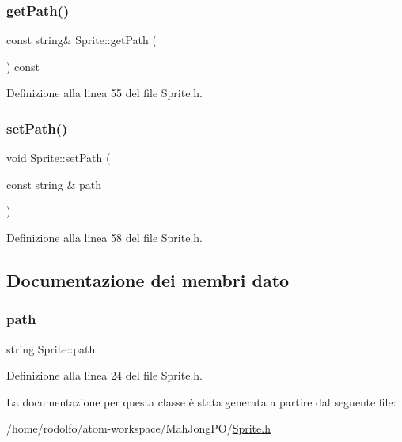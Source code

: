 \subsubsection{\texorpdfstring{get\+Path()}{getPath()}}
{\footnotesize\ttfamily const string\& Sprite\+::get\+Path (\begin{DoxyParamCaption}{ }\end{DoxyParamCaption}) const\hspace{0.3cm}{\ttfamily [inline]}}



Definizione alla linea 55 del file Sprite.\+h.

\mbox{\label{class_sprite_ac688bf8902344f265714447e6aa3a391}} 
\subsubsection{\texorpdfstring{set\+Path()}{setPath()}}
{\footnotesize\ttfamily void Sprite\+::set\+Path (\begin{DoxyParamCaption}\item[{const string \&}]{path }\end{DoxyParamCaption})\hspace{0.3cm}{\ttfamily [inline]}}



Definizione alla linea 58 del file Sprite.\+h.



\subsection{Documentazione dei membri dato}
\mbox{\label{class_sprite_a8f128f4a40eb996f611c64c7d41b1584}} 
\subsubsection{\texorpdfstring{path}{path}}
{\footnotesize\ttfamily string Sprite\+::path\hspace{0.3cm}{\ttfamily [protected]}}



Definizione alla linea 24 del file Sprite.\+h.



La documentazione per questa classe è stata generata a partire dal seguente file\+:\begin{DoxyCompactItemize}
\item 
/home/rodolfo/atom-\/workspace/\+Mah\+Jong\+P\+O/\hyperlink{_sprite_8h}{Sprite.\+h}\end{DoxyCompactItemize}
